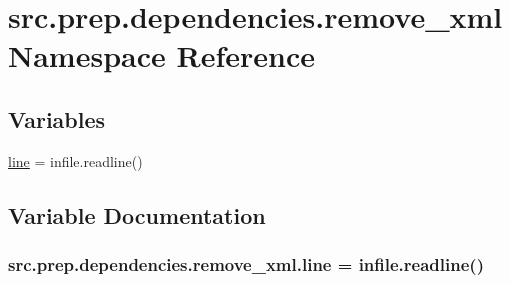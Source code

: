 \hypertarget{namespacesrc_1_1prep_1_1dependencies_1_1remove__xml}{}\section{src.\+prep.\+dependencies.\+remove\+\_\+xml Namespace Reference}
\label{namespacesrc_1_1prep_1_1dependencies_1_1remove__xml}
\subsection*{Variables}
\begin{DoxyCompactItemize}
\item 
\hyperlink{namespacesrc_1_1prep_1_1dependencies_1_1remove__xml_a89d8338166001c38a1adda7e83425148}{line} = infile.\+readline()
\end{DoxyCompactItemize}


\subsection{Variable Documentation}
\subsubsection[{\texorpdfstring{line}{line}}]{\setlength{\rightskip}{0pt plus 5cm}src.\+prep.\+dependencies.\+remove\+\_\+xml.\+line = infile.\+readline()}\hypertarget{namespacesrc_1_1prep_1_1dependencies_1_1remove__xml_a89d8338166001c38a1adda7e83425148}{}\label{namespacesrc_1_1prep_1_1dependencies_1_1remove__xml_a89d8338166001c38a1adda7e83425148}
